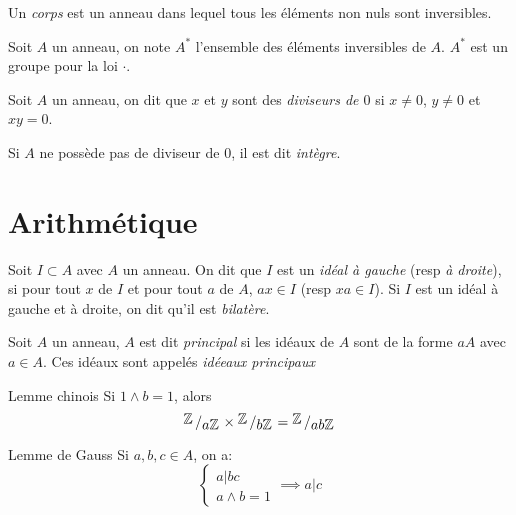 \documentclass[french, a4paper, 11pt, twocolumn]{article}
\newcommand{\bigslant}[2]{{\raisebox{.2em}{$#1$}\left/\raisebox{-.2em}{$#2$}\right.}}
\newcommand{\Z}{\mathbb{Z}}   %
\begin{document}
\begin{definition}
  Un \emph{corps} est un anneau dans lequel tous les éléments non nuls sont inversibles.

  Soit $A$ un anneau, on note $A^{*}$ l'ensemble des éléments inversibles de $A$. $A^{*}$ est un groupe pour la loi $\cdot$.
\end{definition}

\begin{definition}
  Soit $A$ un anneau, on dit que $x$ et $y$ sont des \emph{diviseurs de $0$} si $x\neq 0$, $y\neq 0$ et $xy=0$.

  Si $A$ ne possède pas de diviseur de $0$, il est dit \emph{intègre}.
\end{definition}

\section{Arithmétique}
\begin{definition}
  Soit $I\subset A$ avec $A$ un anneau. On dit que $I$ est un \emph{idéal à gauche} (resp \emph{à droite}), si pour tout $x$ de $I$ et pour tout $a$ de $A$, $ax\in I$ (resp $xa \in I$). Si $I$ est un idéal à gauche et à droite, on dit qu'il est \emph{bilatère}.
\end{definition}

\begin{definition}
  Soit $A$ un anneau, $A$ est dit \emph{principal} si les idéaux de $A$ sont de la forme $aA$ avec $a\in A$. Ces idéaux sont appelés \emph{idéeaux principaux}
\end{definition}

\begin{theoreme}{Lemme chinois}
  Si $1\wedge b = 1$, alors
  \[\bigslant{\Z}{a\Z}\times\bigslant{\Z}{b\Z} = \bigslant{\Z}{ab\Z}\]
\end{theoreme}

\begin{theoreme}{Lemme de Gauss}
  Si $a,b,c\in A$, on a:
  \[\begin{cases}
      a|bc\\
      a\wedge b = 1
    \end{cases}\implies a|c\]
\end{theoreme}
\end{document}
